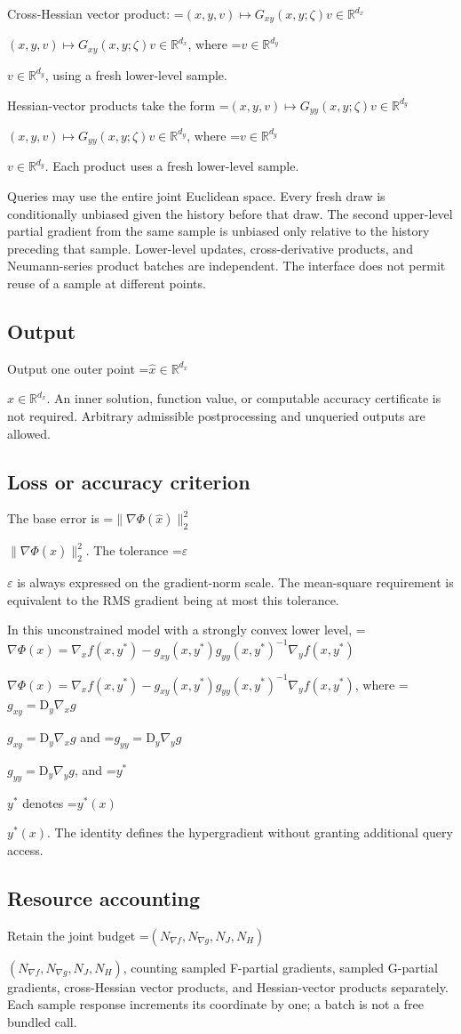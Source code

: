 \documentclass[10pt,a4paper]{article}
\newcommand{\AtlasMath}[1]{\par\begingroup\centering\setbox0=\hbox{$\displaystyle #1$}\ifdim\wd0>1.4\linewidth\typeout{ATLAS WIDE FORMULA: \the\wd0}\fi\ifdim\wd0>\linewidth\resizebox{\linewidth}{!}{\box0}\else\box0\fi\par\endgroup}
\newcommand{\AtlasInlineMath}[1]{\begingroup\setbox0=\hbox{$#1$}\ifdim\wd0>.4\linewidth\endgroup\AtlasMath{#1}\else\endgroup$#1$\fi}
\begin{document}
Cross-Hessian vector product: \AtlasInlineMath{(x,y,v)\mapsto G_{xy}(x,y;\zeta)v\in\mathbb R^{d_x}}, where \AtlasInlineMath{v\in\mathbb R^{d_y}}, using a fresh lower-level sample.

Hessian-vector products take the form \AtlasInlineMath{(x,y,v)\mapsto G_{yy}(x,y;\zeta)v\in\mathbb R^{d_y}}, where \AtlasInlineMath{v\in\mathbb R^{d_y}}. Each product uses a fresh lower-level sample.

Queries may use the entire joint Euclidean space. Every fresh draw is conditionally unbiased given the history before that draw. The second upper-level partial gradient from the same sample is unbiased only relative to the history preceding that sample. Lower-level updates, cross-derivative products, and Neumann-series product batches are independent. The interface does not permit reuse of a sample at different points.

\subsection{Output}
Output one outer point \AtlasInlineMath{\widehat{x}\in\mathbb{R}^{d_x}}. An inner solution, function value, or computable accuracy certificate is not required. Arbitrary admissible postprocessing and unqueried outputs are allowed.

\subsection{Loss or accuracy criterion}
The base error is \AtlasInlineMath{\|\nabla\Phi(\widehat{x})\|_2^2}. The tolerance \AtlasInlineMath{\varepsilon} is always expressed on the gradient-norm scale. The mean-square requirement is equivalent to the RMS gradient being at most this tolerance.

In this unconstrained model with a strongly convex lower level, \AtlasInlineMath{\nabla\Phi(x)=\nabla_x f(x,y^*)-g_{xy}(x,y^*)g_{yy}(x,y^*)^{-1}\nabla_y f(x,y^*)}, where \AtlasInlineMath{g_{xy}=\mathrm{D}_y\nabla_x g} and \AtlasInlineMath{g_{yy}=\mathrm{D}_y\nabla_y g}, and \AtlasInlineMath{y^*} denotes \AtlasInlineMath{y^*(x)}. The identity defines the hypergradient without granting additional query access.

\subsection{Resource accounting}
Retain the joint budget \AtlasInlineMath{(N_{\nabla f},N_{\nabla g},N_J,N_H)}, counting sampled F-partial gradients, sampled G-partial gradients, cross-Hessian vector products, and Hessian-vector products separately. Each sample response increments its coordinate by one; a batch is not a free bundled call.
\end{document}
